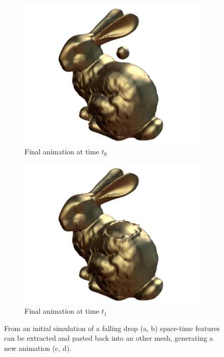 \begin{figure}[!h]
\begin{subfigure}[b]{0.40\linewidth}
		\includegraphics[width=\textwidth]{images/fluidsculpting-mig2016/teaser/bunny_04.png}
		\caption{\label{fig:result_detail:bunny_0}\footnotesize{Final animation at time $t_0$}}
	\end{subfigure}
	\hspace{0.1cm}
	\begin{subfigure}[b]{0.40\linewidth}
		\includegraphics[width=\textwidth]{images/fluidsculpting-mig2016/teaser/bunny_12.png}
		\caption{\label{fig:result_detail:bunny_1}\footnotesize{Final animation at time $t_1$}}
	\end{subfigure}
	\caption[Fluid sculpting: Drop on bunny]{\label{fig:result:teaser}
		From an initial simulation of a falling drop (a, b) space-time features can be extracted and pasted back into an other mesh, generating a new animation (c, d).}
\end{figure}

